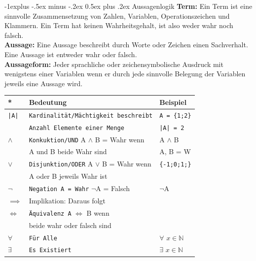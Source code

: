 \documentclass[a4paper,10pt]{article}
\makeatletter
\renewcommand{\subsection}{\@startsection{subsection}{2}{0mm}%
                                {-1explus -.5ex minus -.2ex}%
                                {0.5ex plus .2ex}%
                                {\normalfont\normalsize\bfseries}}
\makeatother
\begin{document}
\begin{multicols}{3}
    \subsection{Aussagenlogik}
    \textbf{Term:}  Ein Term ist eine sinnvolle Zusammensetzung von Zahlen,
    Variablen, Operationszeichen und Klammern.
    Ein Term hat keinen Wahrheitsgehalt, ist also weder wahr noch falsch. \\[2mm]
    \textbf{Aussage:}
    Eine Aussage beschreibt durch Worte oder Zeichen einen Sachverhalt.
    Eine Aussage ist entweder wahr oder falsch. \\[2mm]
    \textbf{Aussageform:}
    Jeder sprachliche oder zeichensymbolische Ausdruck mit wenigstens einer Variablen
    wenn er durch jede sinnvolle Belegung der Variablen jeweils eine Aussage wird.
    \begin{tabular}{l|l|l}
        \textbf{*}            & \textbf{Bedeutung}                                & \textbf{Beispiel}             \\ \hline
        \verb!|A| !           & \verb!Kardinalität/Mächtigkeit beschreibt!        & \verb!A = {1;2}!              \\
                              & \verb!Anzahl Elemente einer Menge!                & \verb!|A| = 2!                \\ \hline
        $\land$               & \verb!Konkuktion/UND! A $\land$ B = Wahr wenn     & A $\land$ B                   \\
                              & A und B beide Wahr sind                           & A, B = W                      \\ \hline
        $\lor$                & \verb!Disjunktion/ODER!  A $\lor$ B  = Wahr wenn  & \verb!{-1;0;1;}!              \\
                              & A oder B  jeweils Wahr ist                        &                               \\ \hline
        $\neg$                & \verb!Negation A = Wahr! $\neg$A = Falsch         & $\neg $A                      \\\hline
        $\implies$            & Implikation: Daraus folgt                         &                               \\ \hline
        $\Longleftrightarrow$ & \verb!Äquivalenz A!  $\Longleftrightarrow$ B wenn &                               \\
                              & beide wahr oder falsch sind                       &                               \\ \hline
        $\forall$             & \verb!Für Alle!                                   & $\forall$ $x \in \mathbb{N}$  \\ \hline
        $\exists$             & \verb!Es Existiert!                               & $\exists $ $x \in \mathbb{N}$ \\ \hline
    \end{tabular}


\end{multicols}
\end{document}
